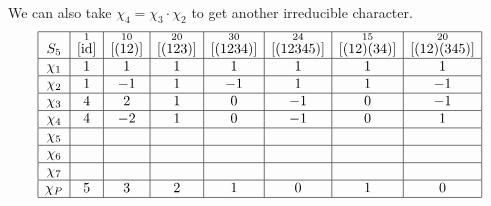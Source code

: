\begin{exmp}{}
\begin{align*}
\begin{array}{|c|c|c|c|c|c|c|c|}
        \end{array} 
    \end{align*}
    We can also take $\chi_4 = \chi_3 \cdot \chi_2$ to get another irreducible 
    character. 
    \begin{align*}
        \begin{array}{|c|c|c|c|c|c|c|c|}
            \hline
            S_5    & \overset{1}{[\id]} & \overset{10}{[(12)]} & \overset{20}{[(123)]} & \overset{30}{[(1234)]} & \overset{24}{[(12345)]} & \overset{15}{[(12)(34)]} & \overset{20}{[(12)(345)]} \\ \hline
            \chi_1 & 1                  & 1                    & 1                     & 1                      & 1                       & 1                        & 1                         \\ \hline
            \chi_2 & 1                  & -1                   & 1                     & -1                     & 1                       & 1                        & -1                        \\ \hline
            \chi_3 & 4                  & 2                    & 1                     & 0                      & -1                      & 0                        & -1                        \\ \hline
            \chi_4 & 4                  & -2                   & 1                     & 0                      & -1                      & 0                        & 1                         \\ \hline
            \chi_5 &                    &                      &                       &                        &                         &                          &                           \\ \hline
            \chi_6 &                    &                      &                       &                        &                         &                          &                           \\ \hline
            \chi_7 &                    &                      &                       &                        &                         &                          &                           \\ \hline
            \chi_P & 5                  & 3                    & 2                     & 1                      & 0                       & 1                        & 0                         \\ \hline 
        \end{array} 

\end{align*}
\end{exmp}
